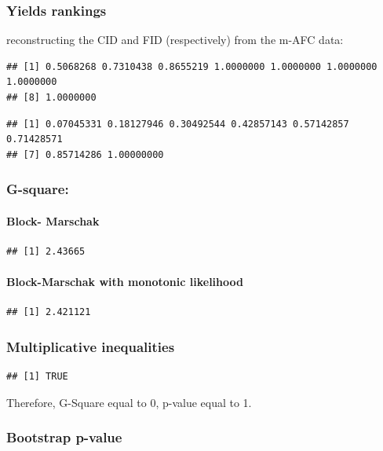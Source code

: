 \documentclass[]{article}
\let\oldparagraph\paragraph
\renewcommand{\paragraph}[1]{\oldparagraph{#1}\mbox{}}
\begin{document}
\subsubsection{Yields rankings}\label{yields-rankings}

reconstructing the CID and FID (respectively) from the m-AFC data:

\begin{verbatim}
## [1] 0.5068268 0.7310438 0.8655219 1.0000000 1.0000000 1.0000000 1.0000000
## [8] 1.0000000
\end{verbatim}

\begin{verbatim}
## [1] 0.07045331 0.18127946 0.30492544 0.42857143 0.57142857 0.71428571
## [7] 0.85714286 1.00000000
\end{verbatim}

\subsubsection{G-square:}\label{g-square}

\paragraph{Block- Marschak}\label{block--marschak}

\begin{verbatim}
## [1] 2.43665
\end{verbatim}

\paragraph{Block-Marschak with monotonic
likelihood}\label{block-marschak-with-monotonic-likelihood}

\begin{verbatim}
## [1] 2.421121
\end{verbatim}

\subsubsection{Multiplicative
inequalities}\label{multiplicative-inequalities}

\begin{verbatim}
## [1] TRUE
\end{verbatim}

Therefore, G-Square equal to 0, p-value equal to 1.

\subsubsection{Bootstrap p-value}\label{bootstrap-p-value}
\end{document}
